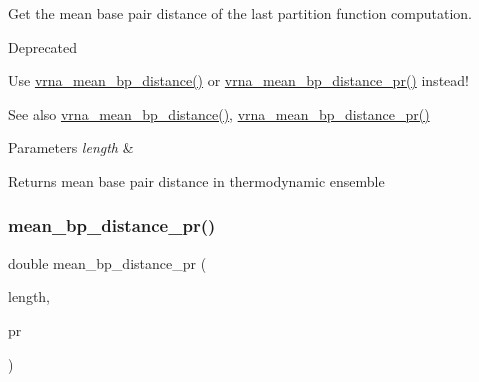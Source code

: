 Get the mean base pair distance of the last partition function computation. 

\begin{DoxyRefDesc}{Deprecated}
\item[\hyperlink{deprecated__deprecated000101}{Deprecated}]Use \hyperlink{group__part__func__global_gaa6b8983b559b9ef4b2e1b31113ea317b}{vrna\+\_\+mean\+\_\+bp\+\_\+distance()} or \hyperlink{group__part__func__global_gad3f0c240512e6d43e2e4d4c2076021f5}{vrna\+\_\+mean\+\_\+bp\+\_\+distance\+\_\+pr()} instead! \end{DoxyRefDesc}
\begin{DoxySeeAlso}{See also}
\hyperlink{group__part__func__global_gaa6b8983b559b9ef4b2e1b31113ea317b}{vrna\+\_\+mean\+\_\+bp\+\_\+distance()}, \hyperlink{group__part__func__global_gad3f0c240512e6d43e2e4d4c2076021f5}{vrna\+\_\+mean\+\_\+bp\+\_\+distance\+\_\+pr()}
\end{DoxySeeAlso}

\begin{DoxyParams}{Parameters}
{\em length} & \\
\hline
\end{DoxyParams}
\begin{DoxyReturn}{Returns}
mean base pair distance in thermodynamic ensemble 
\end{DoxyReturn}
\mbox{\label{group__part__func__global__deprecated_gad5ba36cef8d01cf4244cc09b9bf1ce1d}} 
\subsubsection{\texorpdfstring{mean\+\_\+bp\+\_\+distance\+\_\+pr()}{mean\_bp\_distance\_pr()}}
{\footnotesize\ttfamily double mean\+\_\+bp\+\_\+distance\+\_\+pr (\begin{DoxyParamCaption}\item[{int}]{length,  }\item[{\hyperlink{group__data__structures_ga31125aeace516926bf7f251f759b6126}{F\+L\+T\+\_\+\+O\+R\+\_\+\+D\+BL} $\ast$}]{pr }\end{DoxyParamCaption})}



